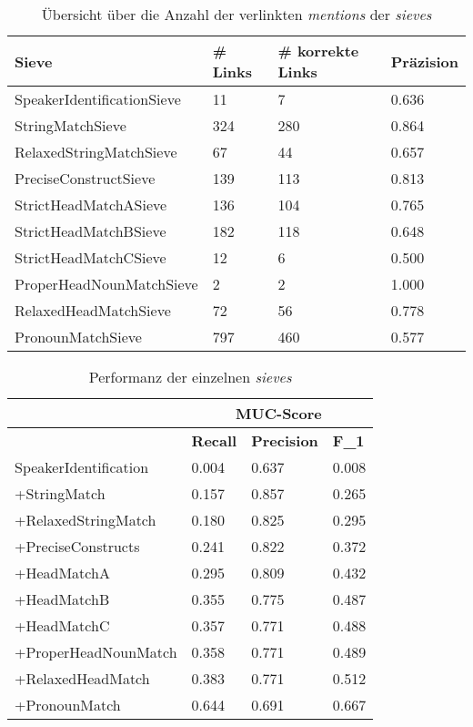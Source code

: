 \documentclass{scrartcl}
\begin{document}
\begin{table}[h]
\begin{tabular}{l||l|l|l}
\textbf{Sieve} & \textbf{\# Links} & \textbf{\# korrekte Links} & \textbf{Präzision} \\\hline
SpeakerIdentificationSieve & 11 & 7 & 0.636 \\
StringMatchSieve & 324 & 280 & 0.864\\
RelaxedStringMatchSieve & 67 & 44 & 0.657 \\
PreciseConstructSieve & 139 & 113 & 0.813 \\
StrictHeadMatchASieve & 136 & 104 & 0.765 \\
StrictHeadMatchBSieve & 182 & 118 & 0.648 \\
StrictHeadMatchCSieve & 12 & 6 & 0.500 \\
ProperHeadNounMatchSieve & 2 & 2 & 1.000 \\
RelaxedHeadMatchSieve & 72 & 56 & 0.778 \\
PronounMatchSieve & 797 & 460 & 0.577
\end{tabular}
\caption{Übersicht über die Anzahl der verlinkten \textit{mentions} der \textit{sieves}}
\label{tab:links}
\end{table}

\begin{table}[h]
\begin{tabular}{l||ll|l}
& \multicolumn{3}{c}{\textbf{MUC-Score}} \\ \hline
	                 & \textbf{Recall} & \textbf{Precision} & \textbf{F\_1} \\ \hline
SpeakerIdentification & 0.004 & 0.637 & 0.008 \\
+StringMatch & 0.157 & 0.857 & 0.265 \\
+RelaxedStringMatch & 0.180 & 0.825 & 0.295 \\
+PreciseConstructs & 0.241 & 0.822 & 0.372 \\
+HeadMatchA & 0.295 & 0.809 & 0.432 \\
+HeadMatchB & 0.355 & 0.775 & 0.487 \\
+HeadMatchC & 0.357 & 0.771 & 0.488 \\
+ProperHeadNounMatch & 0.358 & 0.771 & 0.489 \\
+RelaxedHeadMatch & 0.383 & 0.771 & 0.512 \\
+PronounMatch & 0.644 & 0.691 & 0.667 \\ 
\end{tabular}
\caption{Performanz der einzelnen \textit{sieves}}
\label{tab:sieve_performanz}
\end{table}
\end{document}
